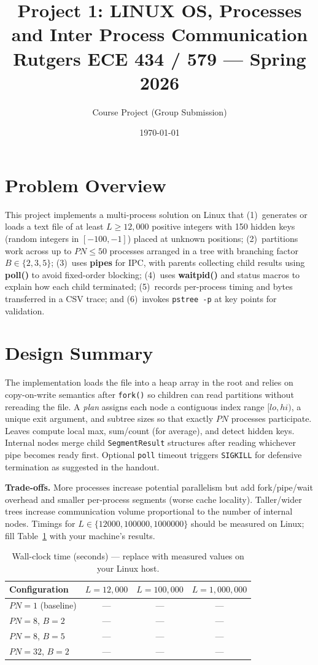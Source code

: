 \documentclass[11pt,a4paper]{article}
\title{\textbf{Project 1: LINUX OS, Processes and Inter Process Communication}\\
\large Rutgers ECE 434 / 579 --- Spring 2026}
\author{Course Project (Group Submission)}
\date{\today}
\begin{document}
\maketitle
\tableofcontents
\clearpage

\section{Problem Overview}
This project implements a multi-process solution on Linux that (1)~generates or loads a text file of at least $L \geq 12{,}000$ positive integers with 150 hidden keys (random integers in $[-100,-1]$) placed at unknown positions; (2)~partitions work across up to $PN \leq 50$ processes arranged in a tree with branching factor $B \in \{2,3,5\}$; (3)~uses \textbf{pipes} for IPC, with parents collecting child results using \textbf{poll()} to avoid fixed-order blocking; (4)~uses \textbf{waitpid()} and status macros to explain how each child terminated; (5)~records per-process timing and bytes transferred in a CSV trace; and (6)~invokes \texttt{pstree -p} at key points for validation.

\section{Design Summary}
The implementation loads the file into a heap array in the root and relies on copy-on-write semantics after \texttt{fork()} so children can read partitions without rereading the file. A \emph{plan} assigns each node a contiguous index range $[lo,hi)$, a unique exit argument, and subtree sizes so that exactly $PN$ processes participate. Leaves compute local max, sum/count (for average), and detect hidden keys. Internal nodes merge child \texttt{SegmentResult} structures after reading whichever pipe becomes ready first. Optional \texttt{poll} timeout triggers \texttt{SIGKILL} for defensive termination as suggested in the handout.

\textbf{Trade-offs.} More processes increase potential parallelism but add fork/pipe/wait overhead and smaller per-process segments (worse cache locality). Taller/wider trees increase communication volume proportional to the number of internal nodes. Timings for $L \in \{12000, 100000, 1000000\}$ should be measured on Linux; fill Table~\ref{tab:timing} with your machine's results.

\begin{table}[ht]
  \centering
  \caption{Wall-clock time (seconds) --- replace with measured values on your Linux host.}
  \label{tab:timing}
  \begin{tabular}{@{}lccc@{}}
    \toprule
    Configuration & $L=12{,}000$ & $L=100{,}000$ & $L=1{,}000{,}000$ \\
    \midrule
    $PN=1$ (baseline) & --- & --- & --- \\
    $PN=8$, $B=2$ & --- & --- & --- \\
    $PN=8$, $B=5$ & --- & --- & --- \\
    $PN=32$, $B=2$ & --- & --- & --- \\
    \bottomrule
  \end{tabular}
\end{table}
\end{document}
